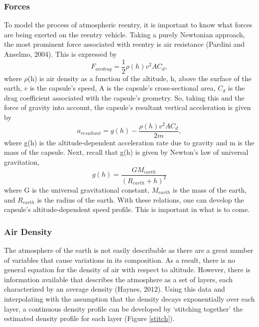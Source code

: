 \documentclass{article}
\begin{document}
\begin{doublespace}
		\subsubsection{Forces}
		\indent\indent To model the process of atmospheric reentry, it is important to know what forces are being exerted on the reentry vehicle. Taking a purely Newtonian approach, the most prominent force  associated with reentry is air resistance (Pardini and Anselmo, 2004). This is expressed by
		\begin{equation}
			F_{air drag}=\frac{1}{2}\rho(h) v^{2}AC_{d},
		\end{equation}
		where $\rho$(h) is air density as a function of the altitude, h, above the surface of the earth, $v$ is the capsule's speed, A is the capsule's cross-sectional area, $C_{d}$ is the drag coefficient associated with the capsule's geometry. So, taking this and the force of gravity into account, the capsule's resultant vertical acceleration is given by\\
		\begin{equation}
			a_{resultant}=g(h)-\frac{\rho(h)v^{2}AC_{d}}{2m},
		\end{equation}
		 where g(h) is the altitude-dependent acceleration rate due to gravity and m is the mass of the capsule. Next, recall that g(h) is given by Newton's law of universal gravitation,
 		\begin{equation}
			g(h)=\frac{GM_{earth}}{(R_{earth}+h)^{2}}		
		\end{equation}
		where G is the universal gravitational constant, $M_{earth}$  is the mass of the earth, and $R_{earth}$ is the radius of the earth. With these relations, one can develop the capsule's altitude-dependent speed profile. This is important in what is to come.
		\subsubsection{Air Density}
		\indent\indent The atmosphere of the earth is not easily describable as there are a great number of variables that cause variations in its composition. As a result, there is no general equation for the density of air with respect to altitude. However, there is information available that describes the atmosphere as a set of layers, each characterized by an average density (Haynes, 2012). Using this data and interpolating with the assumption that the density decays exponentially over each layer, a continuous density profile can be developed by `stitching together' the estimated density profile for each layer (Figure \ref{stitch}).

\end{doublespace}
\end{document}
